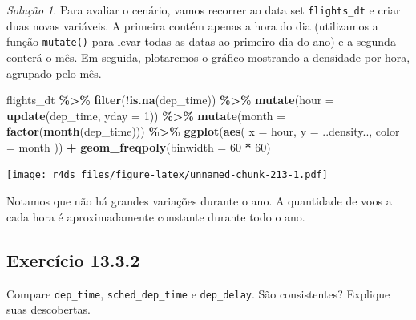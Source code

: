 \documentclass[
]{latex/krantz}
\newenvironment{Shaded}{\begin{snugshade}}{\end{snugshade}}
\newcommand{\AttributeTok}[1]{\textcolor[rgb]{0.13,0.29,0.53}{#1}}
\newcommand{\DecValTok}[1]{\textcolor[rgb]{0.00,0.00,0.81}{#1}}
\newcommand{\FunctionTok}[1]{\textcolor[rgb]{0.13,0.29,0.53}{\textbf{#1}}}
\newcommand{\NormalTok}[1]{#1}
\newcommand{\SpecialCharTok}[1]{\textcolor[rgb]{0.81,0.36,0.00}{\textbf{#1}}}
\theoremstyle{definition}
\theoremstyle{definition}
\theoremstyle{definition}
\theoremstyle{definition}
\theoremstyle{remark}
\newtheorem*{solution}{Solução}
\begin{document}
\begin{solution}
Para avaliar o cenário, vamos recorrer ao data set \texttt{flights\_dt} e criar duas novas variáveis. A primeira contém apenas a hora do dia (utilizamos a função \texttt{mutate()} para levar todas as datas ao primeiro dia do ano) e a segunda conterá o mês. Em seguida, plotaremos o gráfico mostrando a densidade por hora, agrupado pelo mês.

\begin{Shaded}
\begin{Highlighting}[]
\NormalTok{flights\_dt }\SpecialCharTok{\%\textgreater{}\%}
  \FunctionTok{filter}\NormalTok{(}\SpecialCharTok{!}\FunctionTok{is.na}\NormalTok{(dep\_time)) }\SpecialCharTok{\%\textgreater{}\%}
  \FunctionTok{mutate}\NormalTok{(}\AttributeTok{hour =} \FunctionTok{update}\NormalTok{(dep\_time, }\AttributeTok{yday =} \DecValTok{1}\NormalTok{)) }\SpecialCharTok{\%\textgreater{}\%}
  \FunctionTok{mutate}\NormalTok{(}\AttributeTok{month =} \FunctionTok{factor}\NormalTok{(}\FunctionTok{month}\NormalTok{(dep\_time))) }\SpecialCharTok{\%\textgreater{}\%}
  \FunctionTok{ggplot}\NormalTok{(}\FunctionTok{aes}\NormalTok{(}
    \AttributeTok{x =}\NormalTok{ hour, }
    \AttributeTok{y =}\NormalTok{ ..density..,}
    \AttributeTok{color =}\NormalTok{ month}
\NormalTok{  )) }\SpecialCharTok{+}
    \FunctionTok{geom\_freqpoly}\NormalTok{(}\AttributeTok{binwidth =} \DecValTok{60} \SpecialCharTok{*} \DecValTok{60}\NormalTok{)}
\end{Highlighting}
\end{Shaded}

\texttt{[image: r4ds\_files/figure-latex/unnamed-chunk-213-1.pdf]}

Notamos que não há grandes variações durante o ano. A quantidade de voos a cada hora é aproximadamente constante durante todo o ano.
\end{solution}

\hypertarget{exr13-3-2}{%
\subsection*{Exercício 13.3.2}\label{exr13-3-2}}

Compare \texttt{dep\_time}, \texttt{sched\_dep\_time} e \texttt{dep\_delay}. São consistentes? Explique suas descobertas.
\end{document}
